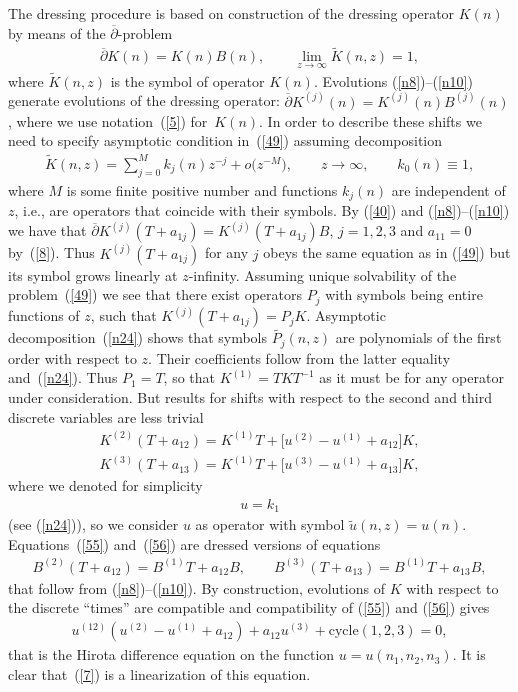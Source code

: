 \documentclass[pdftex]{sigma}
\numberwithin{equation}{section}
\begin{document}
The dressing procedure is based on construction of the dressing operator $K(n)$ by means of the $\overline\partial$-problem
\begin{gather}
 \overline\partial{K}(n)=K(n)B(n),\qquad \lim_{z\to\infty}\widetilde{K}(n,z)=1,\label{49}
\end{gather}
where $\widetilde{K}(n,z)$ is the symbol of operator $K(n)$. Evolutions (\ref{n8})--(\ref{n10}) generate evolutions of the dressing operator: $\overline\partial{K}^{(j)}(n)=K^{(j)}(n)B^{(j)}(n)$, where we use notation~(\ref{5}) for~$K(n)$. In order to describe these shifts we need to specify asymptotic condition in~(\ref{49}) assuming decomposition
\begin{gather}
\widetilde{K}(n,z)=\sum_{j=0}^{M}k_{j}(n)z^{-j}+o\big(z^{-M}\big),\qquad z\to\infty,\qquad k_{0}(n)\equiv1,\label{n24}
\end{gather}
where $M$ is some f\/inite positive number and functions $k_j(n)$ are independent of $z$, i.e., are operators that coincide with their symbols. By (\ref{40}) and (\ref{n8})--(\ref{n10}) we have that $\overline\partial{K}^{(j)}(T+a_{1j})={K}^{(j)}(T+a_{1j})B$, $j=1,2,3$ and $a_{11}=0$ by~(\ref{8}). Thus ${K}^{(j)}(T+a_{1j})$ for any $j$ obeys the same equation as in (\ref{49}) but its symbol grows linearly at $z$-inf\/inity. Assuming unique solvability of the problem~(\ref{49}) we see that there exist operators $P_{j}$ with symbols being entire functions of $z$, such that ${K}^{(j)}(T+a_{1j})=P_{j}K$. Asymptotic decomposition~(\ref{n24}) shows that symbols $\widetilde{P_{j}}(n,z)$ are polynomials of the f\/irst order with respect to $z$. Their coef\/f\/icients follow from the latter equality and~(\ref{n24}). Thus $P_{1}=T$, so that $K^{(1)}=TKT^{-1}$ as it must be for any operator under consideration. But results for shifts with respect to the second and third discrete variables are less trivial
\begin{gather}
K^{(2)}(T+a_{12})=K^{(1)}T+\bigl[u^{(2)}-u^{(1)}+a_{12}\bigr]K,\label{55}\\
K^{(3)}(T+a_{13})=K^{(1)}T+\bigl[u^{(3)}-u^{(1)}+a_{13}\bigr]K,\label{56}
\end{gather}
where we denoted for simplicity
\begin{gather}
u=k_1\label{54}
\end{gather}
(see (\ref{n24})), so we consider $u$ as operator with symbol $\widetilde{u}(n,z)=u(n)$. Equations~(\ref{55}) and~(\ref{56}) are dressed versions of equations
\begin{gather}
B^{(2)}(T+a_{12})=B^{(1)}T+a_{12}B,\qquad B^{(3)}(T+a_{13})=B^{(1)}T+a_{13}B,\label{50}
\end{gather}
that follow from (\ref{n8})--(\ref{n10}). By construction, evolutions of $K$ with respect to the discrete ``times'' are compatible and compatibility of (\ref{55}) and (\ref{56}) gives
\begin{gather}
 u^{(12)}(u^{(2)}-u^{(1)}+a_{12})+a_{12}u^{(3)}+\text{cycle}(1,2,3)=0,\label{57}
\end{gather}
that is the Hirota dif\/ference equation on the function $u=u(n_1,n_2,n_3)$. It is clear that~(\ref{7}) is a linearization of this equation.
\end{document}
